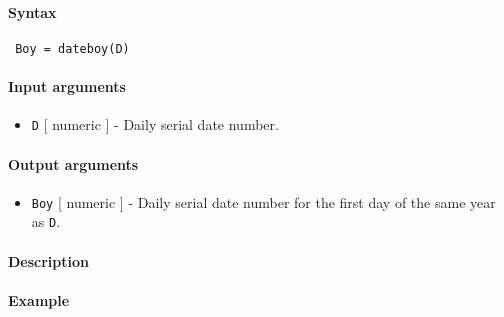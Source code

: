 


	\paragraph{Syntax}
 
 \begin{verbatim}
 Boy = dateboy(D)
 \end{verbatim}
 
 \paragraph{Input arguments}
 
 \begin{itemize}
 \item
   \texttt{D} {[} numeric {]} - Daily serial date number.
 \end{itemize}
 
 \paragraph{Output arguments}
 
 \begin{itemize}
 \item
   \texttt{Boy} {[} numeric {]} - Daily serial date number for the first
   day of the same year as \texttt{D}.
 \end{itemize}
 
 \paragraph{Description}
 
 \paragraph{Example}


